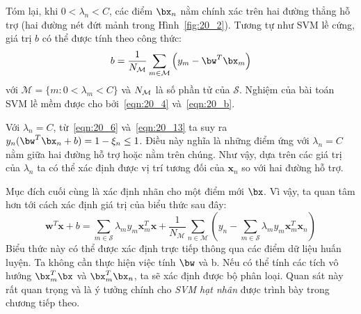 Tóm lại, khi $0 < \lambda_n < C$, các điểm $\bx_n$ nằm chính xác trên hai đường thẳng hỗ trợ (hai đường nét đứt mảnh trong Hình~\ref{fig:20_2}). Tương tự 
như SVM lề cứng, giá trị $b$ có thể được tính theo công thức:
\begin{equation}
\label{eqn:20_b}
    b = \frac{1}{N_{\mathcal{M}}} \sum_{m\in \mathcal{M}}\left(y_m -
    \bw^T\bx_m\right)
\end{equation}
với $\mathcal{M} = \{m: 0 < \lambda_m < C\}$ và $N_{\mathcal{M}}$ là số phần tử của
$\mathcal{S}$.
Nghiệm của bài toán SVM lề mềm được cho bởi~\eqref{eqn:20_4}
và~\eqref{eqn:20_b}.

Với $\lambda_n = C$, từ~\eqref{eqn:20_6} và~\eqref{eqn:20_13} ta suy ra $y_n(\bw^T\bx_n + b) = 1 - \xi_n \leq 1$. Điều này nghĩa là những điểm ứng với $\lambda_n = C$ nằm
giữa hai đường hỗ trợ hoặc nằm trên chúng. 
Như vậy, dựa trên các giá trị của $\lambda_n$ ta có thể xác định được vị trí
tương đối của $\mathbf{x}_n$ so với hai đường hỗ trợ. 

 
Mục đích cuối cùng là xác định nhãn cho một điểm mới $\bx$. Vì vậy, ta quan tâm hơn tới cách xác định giá
trị
của biểu thức sau đây:
\begin{equation} 
\mathbf{w}^T\mathbf{x} + b = \sum_{m \in \mathcal{S}} \lambda_m y_m \mathbf{x}_m^T \mathbf{x} + \frac{1}{N_{\mathcal{M}}} \sum_{n \in \mathcal{M}} \left(y_n - \sum_{m \in \mathcal{S}} \lambda_m y_m \mathbf{x}_m^T\mathbf{x}_n\right) 
\end{equation} 
Biểu thức này có thể được xác định trực tiếp thông qua các điểm dữ liệu huấn luyện. Ta không cần thực hiện việc tính $\bw$ và b. Nếu có thể tính các tích vô hướng $\bx_m^T\bx$ và
$\bx_m^T\bx_n$, ta sẽ xác định được bộ phân loại. Quan sát này rất quan trọng và là ý tưởng chính cho \textit{SVM hạt nhân} được trình bày trong chương tiếp theo. 

 
